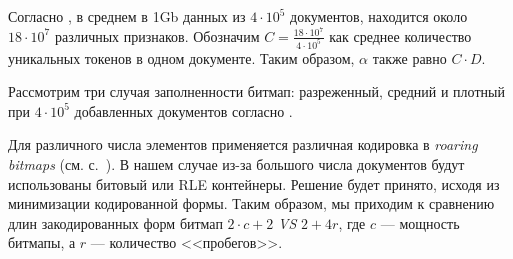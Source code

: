 Согласно \cite{Features:2020}, в среднем в 1Gb
данных из $4\cdot 10^5$ документов, находится около $18 \cdot 10^7$ различных
признаков. Обозначим $C = \frac{18 \cdot 10^7}{4\cdot 10^5}$ как среднее количество
уникальных токенов в одном документе. Таким образом, $\alpha$ также равно $C\cdot D$.

Рассмотрим три случая заполненности битмап: разреженный, средний и плотный
при $4 \cdot 10^5$ добавленных документов согласно \cite{Features:2020}.

Для различного числа элементов применяется различная кодировка в
\textit{roaring bitmaps} (см. с.~\pageref{bitmap}). В нашем случае из-за большого
числа документов будут использованы битовый или RLE контейнеры. Решение будет
принято, исходя из минимизации кодированной формы. Таким образом, мы приходим к
сравнению длин закодированных форм битмап $2\cdot c + 2$ \textit{VS} $2 + 4r$,
где $c$ — мощность битмапы, а $r$ — количество <<пробегов>>.

